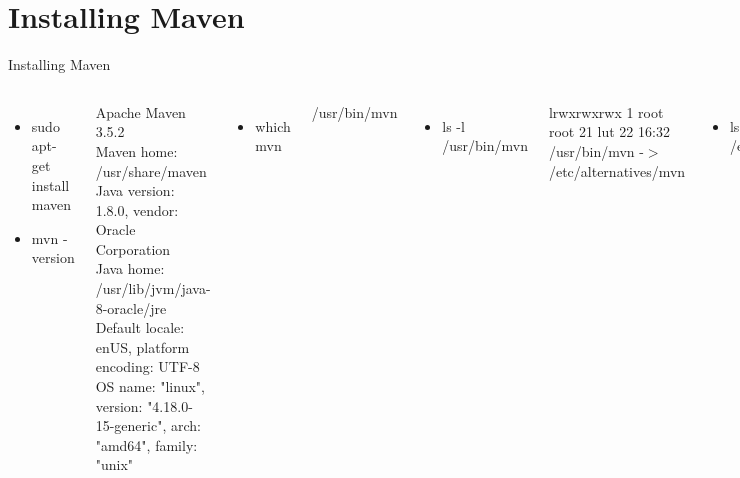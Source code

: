 \documentclass[aspectratio=1610,english]{beamer} %
\begin{document}
  	\section{Installing Maven}\label{sec:installingmaven}
	\begin{frame}{Installing Maven}
		\begin{columns}
				\begin{itemize}
					\small
					\color{black}
					\item sudo apt-get install maven 
					\item mvn -version
				\end{itemize}
				\tiny
				Apache Maven 3.5.2 \\
				Maven home: /usr/share/maven \\
				Java version: 1.8.0, vendor: Oracle Corporation \\
				Java home: /usr/lib/jvm/java-8-oracle/jre \\
				Default locale: en\textunderscore US, platform encoding: UTF-8 \\
				OS name: "linux", version: "4.18.0-15-generic", arch: "amd64", family: "unix"
				\begin{itemize}
					\small
					\color{black}
					\item which mvn 
				\end{itemize}
				\tiny
				/usr/bin/mvn
				\begin{itemize}
					\small
					\color{black}
					\item ls -l /usr/bin/mvn 
				\end{itemize}
				\tiny
				lrwxrwxrwx 1 root root 21 lut 22 16:32 /usr/bin/mvn -$>$ /etc/alternatives/mvn
				\begin{itemize}
					\small
					\color{black}
					\item ls -l /etc/alternatives/mvn 
				\end{itemize}
				\tiny
				lrwxrwxrwx 1 root root 24 lut 22 16:32 /etc/alternatives/mvn -$>$ /usr/share/maven/bin/mvn
				\begin{itemize}
					\small
					\color{black}
					\item ls -l /usr/share/maven/bin/mvn 
				\end{itemize}
				\tiny
				-rwxr-xr-x 1 root root 5969 paź 18  2017 /usr/share/maven/bin/mvn
				\begin{itemize}
					\small
					\color{black}
					\item This is Maven's real location
				\end{itemize}
		\end{columns}
	\end{frame}
\end{document}
